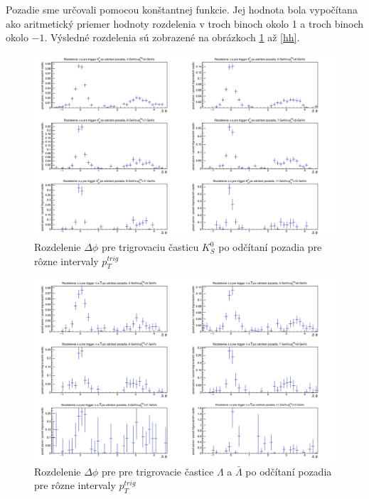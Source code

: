 \documentclass[thesismargins, thesislinespacing]{rnthesis}
\begin{document}
Pozadie sme určovali pomocou konštantnej funkcie. Jej hodnota bola vypočítana ako aritmetický priemer hodnoty rozdelenia v troch binoch okolo 1 a troch binoch okolo $-1$. Výsledné rozdelenia sú zobrazené na obrázkoch \ref{K0} až \ref{hh}. 

\begin{figure}[hbtp!]
	\centering
	\includegraphics[width=\textwidth]{./Obrazky_praca/DeltaPhiKH.png}
	\caption{Rozdelenie $\Delta \phi$ pre trigrovaciu časticu $K^0_S$ po odčítaní pozadia pre rôzne intervaly $p_T^{trig}$}
	\label{K0}
\end{figure}

\begin{figure}[hbtp!]
	\centering
	\includegraphics[width=\textwidth]{./Obrazky_praca/DeltaPhiLH.png}
	\caption{Rozdelenie $\Delta \phi$ pre pre trigrovacie častice $\Lambda$ a $\bar{\Lambda}$  po odčítaní pozadia pre rôzne intervaly $p_T^{trig}$}
	\label{lambda}
\end{figure}
\end{document}
